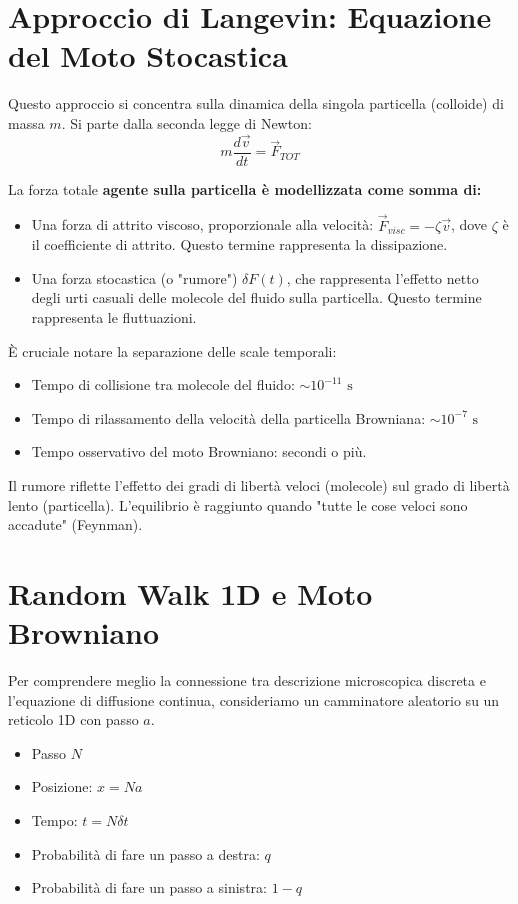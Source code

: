 \section{Approccio di Langevin: Equazione del Moto Stocastica}
Questo approccio si concentra sulla dinamica della singola particella (colloide) di massa $m$. Si parte dalla seconda legge di Newton:
\begin{equation}
\label{eq:newton_langevin}
m \frac{d\vec{v}}{dt} = \vec{F}_{TOT}
\end{equation}

La forza totale \textbf{agente sulla particella è modellizzata come somma di:}
\begin{itemize}
    \item Una forza di attrito viscoso, proporzionale alla velocità: $\vec{F}_{visc} = -\zeta \vec{v}$, dove $\zeta$ è il coefficiente di attrito. Questo termine rappresenta la dissipazione.
    \item Una forza stocastica (o "rumore") $\delta F(t)$, che rappresenta l'effetto netto degli urti casuali delle molecole del fluido sulla particella. Questo termine rappresenta le fluttuazioni.
\end{itemize}

È cruciale notare la separazione delle scale temporali:
\begin{itemize}
    \item Tempo di collisione tra molecole del fluido: $\sim 10^{-11} \text{ s}$
    \item Tempo di rilassamento della velocità della particella Browniana: $\sim 10^{-7} \text{ s}$
    \item Tempo osservativo del moto Browniano: secondi o più.
\end{itemize}
Il rumore riflette l'effetto dei gradi di libertà veloci (molecole) sul grado di libertà lento (particella). L'equilibrio è raggiunto quando "tutte le cose veloci sono accadute" (Feynman).

\section{Random Walk 1D e Moto Browniano}
Per comprendere meglio la connessione tra descrizione microscopica discreta e l'equazione di diffusione continua, consideriamo un camminatore aleatorio su un reticolo 1D con passo $a$.

\begin{itemize}
    \item Passo $N$
    \item Posizione: $x = Na$
    \item Tempo: $t = N \delta t$
    \item Probabilità di fare un passo a destra: $q$
    \item Probabilità di fare un passo a sinistra: $1-q$
\end{itemize}

